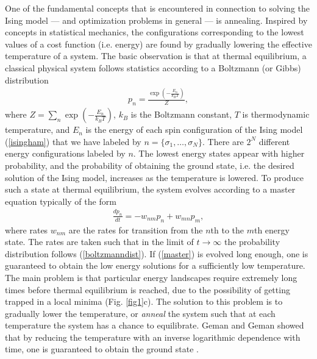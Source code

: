 \documentclass[fleqn,10pt]{wlscirep}
\def\change#1{#1}
\begin{document}
One of the fundamental concepts that is encountered in connection to solving the Ising model --- and optimization problems in general --- is annealing. Inspired by concepts in statistical mechanics, the configurations corresponding to the lowest values of a cost function (i.e. energy) are found by gradually lowering the effective temperature of a system.  The basic observation is that at thermal equilibrium, a classical physical system follows statistics according to a Boltzmann (or Gibbs) distribution
%
\begin{align}
    p_n = \frac{\exp( - \frac{E_n}{k_B T})}{Z} ,
    \label{boltzmanndist}
\end{align}
%
where $ Z = \sum_n  \exp( - \frac{E_n}{k_B T}) $, $ k_B $ is the Boltzmann constant, $T$ is thermodynamic temperature, and \change{$E_n$ is the energy of} each spin configuration of the Ising model (\ref{isingham}) that we have labeled by $ n = \{ \sigma_1, \dots, \sigma_N \} $. There are $ 2^N $ different energy configurations labeled by $ n $. \change{The lowest energy states appear with higher probability, and the probability of obtaining the ground state, i.e. the desired solution of the Ising model, increases as the temperature is  lowered.}
To produce such a state at thermal equilibrium, the system evolves according to a master equation typically of the form
%
\begin{align}
    \frac{d p_n}{dt}= - w_{nm} p_n + w_{mn} p_m,
    \label{master}
\end{align}
%
where rates $ w_{nm} $ are the rates for transition from the $n$th to the $m$th energy state.  The rates are taken such that in the limit of $ t \rightarrow \infty$ the probability distribution follows (\ref{boltzmanndist}).  If  (\ref{master}) is evolved long enough, one is guaranteed to obtain the low energy solutions for a sufficiently low temperature.  The main problem is that particular energy landscapes require extremely long times before thermal equilibrium is reached, due to the possibility of getting trapped in a local minima (Fig. \ref{fig1}c).  The solution to this problem is to gradually lower the temperature, or {\it anneal} the system such that at each temperature the system has a chance \change{to} equilibrate.  Geman and Geman showed that by reducing the temperature with an inverse logarithmic dependence with time, one is guaranteed to obtain the ground state \cite{geman1984stochastic}.  
\end{document}
